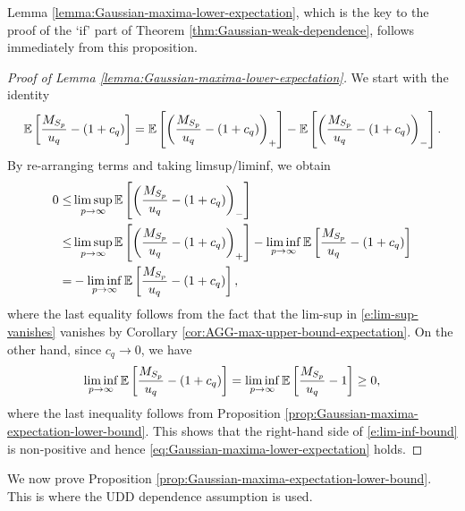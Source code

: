 Lemma \ref{lemma:Gaussian-maxima-lower-expectation}, which is the key to the proof of the `if' part of Theorem \ref{thm:Gaussian-weak-dependence}, follows immediately from this proposition.

\begin{proof}[Proof of Lemma \ref{lemma:Gaussian-maxima-lower-expectation}]
We start with the identity
$$
{\mathbb E}\left[\frac{M_{S_p}}{u_q}-(1+c_q)\right] = {\mathbb E}\left[\left(\frac{M_{S_p}}{u_q}-(1+c_q)\right)_+\right] - {\mathbb E}\left[\left(\frac{M_{S_p}}{u_q}-(1+c_q)\right)_-\right].
$$
By re-arranging terms and taking limsup/liminf, we obtain
\begin{align} \label{e:lim-sup-vanishes}
    0 \le &\limsup_{p\to\infty}\E\left[\left(\frac{M_{S_p}}{u_q}-(1+c_q)\right)_-\right]\nonumber \\
        \le & \limsup_{p\to\infty}\E\left[\left(\frac{M_{S_p}}{u_q}-(1+c_q)\right)_+\right] - \liminf_{p\to\infty}\E\left[\frac{M_{S_p}}{u_q}-(1+c_q)\right]\\
        = & - \liminf_{p\to\infty}\E\left[\frac{M_{S_p}}{u_q}-(1+c_q)\right],
        \label{e:lim-inf-bound}
\end{align}
where the last equality follows from the fact that the lim-sup in \eqref{e:lim-sup-vanishes} vanishes by Corollary \ref{cor:AGG-max-upper-bound-expectation}.
On the other hand, since $c_q\to 0$, we have
$$
\liminf_{p\to\infty}{\mathbb E}\left[\frac{M_{S_p}}{u_q}-(1+c_q)\right] 
= \liminf_{p\to\infty}{\mathbb E}\left[\frac{M_{S_p}}{u_q}-1\right] \ge 0,
$$
where the last inequality follows from Proposition \ref{prop:Gaussian-maxima-expectation-lower-bound}.  This shows that 
the right-hand side of \eqref{e:lim-inf-bound} is non-positive and hence
\eqref{eq:Gaussian-maxima-lower-expectation} holds. 
\end{proof}

We now prove Proposition \ref{prop:Gaussian-maxima-expectation-lower-bound}. This is where the UDD dependence assumption is used.

